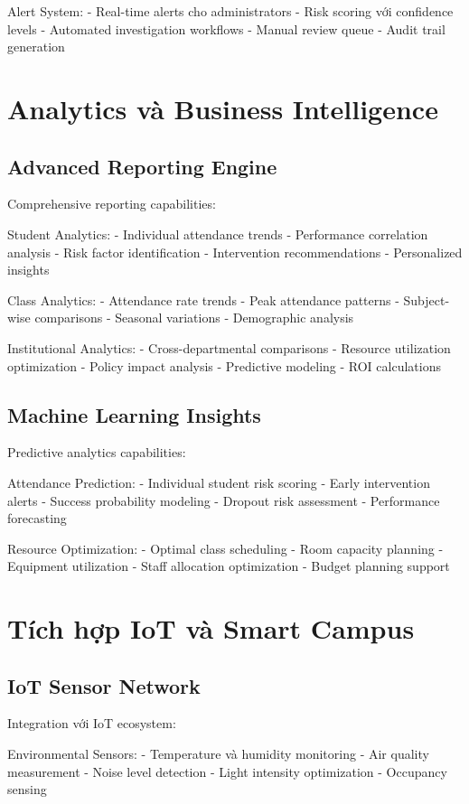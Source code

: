 \documentclass[12pt,a4paper]{report}
\begin{document}
Alert System:
- Real-time alerts cho administrators
- Risk scoring với confidence levels
- Automated investigation workflows
- Manual review queue
- Audit trail generation

\section{Analytics và Business Intelligence}
\subsection{Advanced Reporting Engine}
Comprehensive reporting capabilities:

Student Analytics:
- Individual attendance trends
- Performance correlation analysis
- Risk factor identification
- Intervention recommendations
- Personalized insights

Class Analytics:
- Attendance rate trends
- Peak attendance patterns
- Subject-wise comparisons
- Seasonal variations
- Demographic analysis

Institutional Analytics:
- Cross-departmental comparisons
- Resource utilization optimization
- Policy impact analysis
- Predictive modeling
- ROI calculations

\subsection{Machine Learning Insights}
Predictive analytics capabilities:

Attendance Prediction:
- Individual student risk scoring
- Early intervention alerts
- Success probability modeling
- Dropout risk assessment
- Performance forecasting

Resource Optimization:
- Optimal class scheduling
- Room capacity planning
- Equipment utilization
- Staff allocation optimization
- Budget planning support

\section{Tích hợp IoT và Smart Campus}
\subsection{IoT Sensor Network}
Integration với IoT ecosystem:

Environmental Sensors:
- Temperature và humidity monitoring
- Air quality measurement
- Noise level detection
- Light intensity optimization
- Occupancy sensing
\end{document}
